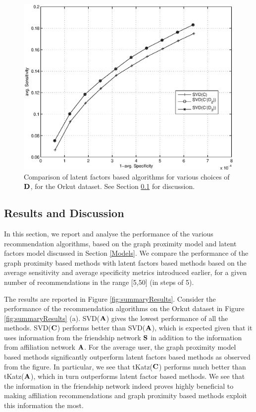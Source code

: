 \documentclass{sig-alternate}
\begin{document}
\begin{figure}[h]
  \begin{center}
    \includegraphics[scale=0.4]{summarySVDOrkut.eps}
  \end{center}
  \caption{Comparison of latent factors based algorithms for various choices of $\mathbf{D}$, for the Orkut dataset. See Section \ref{Results and Discussion} for discussion.}
  \label{fig:summarySVD}
\end{figure}

\subsection{Results and Discussion}
\label{Results and Discussion}
In this section, we report and analyse the performance of the various recommendation algorithms, based on the graph proximity model and latent factors model discussed in Section \ref{Models}. We compare the performance of the graph proximity based methods with latent factors based methods based on the average sensitivity and average specificity metrics introduced earlier, for a given number of recommendations in the range [5,50] (in steps of 5).

The results are reported in Figure \ref{fig:summaryResults}.
Consider the performance of the recommendation algorithms on the Orkut dataset in Figure \ref{fig:summaryResults} (a). SVD($\mathbf{A}$) gives the lowest performance of all the methods. SVD($\mathbf{C}$) performs better than SVD($\mathbf{A}$), which is expected given that it uses information from the friendship network $\mathbf{S}$ in addition to the information from affiliation network $\mathbf{A}$. For the average user, the graph proximity model based methods significantly outperform latent factors based methods as observed from the figure. In particular, we see that tKatz($\mathbf{C}$) performs much better than tKatz($\mathbf{A}$), which in turn outperforms latent factor based methods. We see that the information in the friendship network indeed proves highly beneficial to making affiliation recommendations and graph proximity based methods exploit this information the most.
\end{document}
